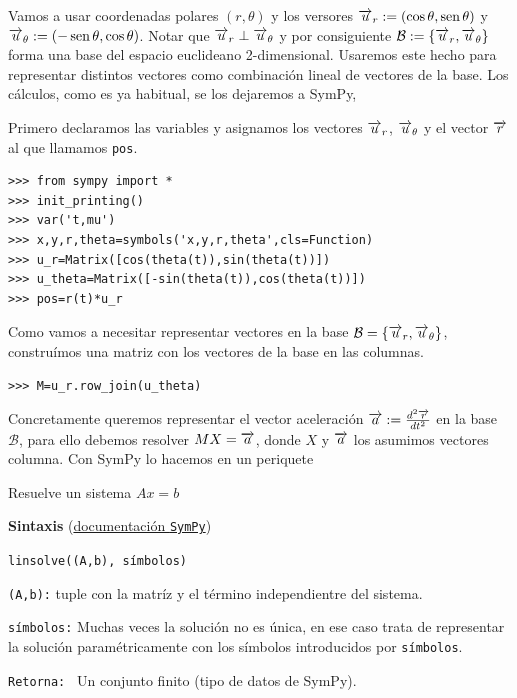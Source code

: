 Vamos a usar coordenadas polares $(r,\theta)$ y los versores $\overrightarrow{u}_r:=(\cos\theta,\operatorname{sen}\theta)$ y $\overrightarrow{u}_{\theta}:=(-\operatorname{sen}\theta, \cos\theta)$. Notar que
$\overrightarrow{u}_r \perp \overrightarrow{u}_{\theta}$ y por consiguiente $\mathcal{B}:=\{\overrightarrow{u}_r , \overrightarrow{u}_{\theta}\}$ forma una base del espacio euclideano 2-dimensional. Usaremos este hecho
para representar distintos vectores como combinación lineal de vectores de la base. Los cálculos, como es ya habitual, se los dejaremos a SymPy,


Primero declaramos las variables y asignamos los vectores $\overrightarrow{u}_r$, $\overrightarrow{u}_{\theta}$ y el vector
$\overrightarrow{r}$ al que llamamos \texttt{pos}.

\begin{lstlisting}
>>> from sympy import *
>>> init_printing()
>>> var('t,mu')
>>> x,y,r,theta=symbols('x,y,r,theta',cls=Function)
>>> u_r=Matrix([cos(theta(t)),sin(theta(t))])
>>> u_theta=Matrix([-sin(theta(t)),cos(theta(t))])
>>> pos=r(t)*u_r
\end{lstlisting}



Como vamos a necesitar representar vectores en la base $\mathcal{B}=\{\overrightarrow{u}_r , \overrightarrow{u}_{\theta}\}$, construímos una matriz
con los vectores de la base en las columnas.
\begin{lstlisting}
>>> M=u_r.row_join(u_theta)
\end{lstlisting}
Concretamente queremos representar el vector aceleración $\overrightarrow{a}:=\tfrac{d^2\overrightarrow{r}}{dt^2}$ en la base $\mathcal{B}$, para ello debemos resolver $MX=\overrightarrow{a}$, donde $X$ y
$\overrightarrow{a}$ los asumimos vectores columna. Con SymPy lo hacemos en un periquete

\begin{codigo}
Resuelve un sistema $Ax=b$

\textbf{Sintaxis} (\href{http://docs.sympy.org/dev/modules/solvers/solveset.html#sympy.solvers.solveset.linsolve}{documentación \texttt{SymPy}})

\texttt{linsolve((A,b), símbolos)}

\texttt{(A,b):} tuple con la matríz y el término independientre del sistema.

\texttt{símbolos:} Muchas veces la solución no es única, en ese caso trata de representar la solución paramétricamente con los símbolos introducidos por \texttt{símbolos}.

\texttt{Retorna: } Un conjunto finito (tipo de datos de SymPy).

\end{codigo}



